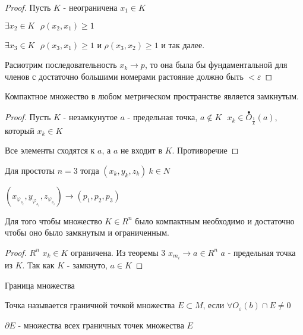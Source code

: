 \begin{proof}
  Пусть $K$ - неограничена $x_1 \in K$

  $\exists x_2 \in K ~~~ \rho(x_2, x_1) \ge 1$

  $\exists x_3 \in K ~~~ \rho(x_3, x_1) \ge 1$ и $\rho(x_3, x_2) \ge 1$ и так
  далее.

  Расиотрим последовательность $x_k \to p$, то она была бы фундаментальной для
  членов с достаточно большими номерами растояние должно быть $< \varepsilon$
\end{proof}

\begin{theorem}
  Компактное множество в любом метрическом пространстве является замкнутым.
\end{theorem}

\begin{proof}
  Пусть $K$ - незамкунутое $a$ - предельная точка, $a \not\in K ~~~
  x_k \in \stackrel{\bullet}{O}_{\frac{1}{k}}(a)$, который $x_k \in K$

  Все элементы сходятся к $a$, а $a$ не входит в $K$. Противоречие
\end{proof}

\begin{theorem}
  Для простоты $n = 3$ тогда $(x_k, y_k, z_k) ~ k \in N$

  $(x_{\varphi_{s_i}}, y_{\varphi_{s_i}}, z_{\varphi_{s_i}}) \to
  (p_1, p_2, p_3)$
\end{theorem}

\begin{theorem}
  Для того чтобы множество $K \in R^n$ было компактным необходимо и достаточно
  чтобы оно было замкнутым и ограниченным.
\end{theorem}

\begin{proof}
  $R^n$ $x_k \in K$ ограничена. Из теоремы 3 $x_{m_i} \to a \in R^n$ $a$ -
  предельная точка из $K$. Так как $K$ - замкнуто, $a \in K$
\end{proof}

\begin{title}[\Large]
  Граница множества
\end{title}

\begin{define}
  Точка называется граничной точкой множества $E \subset M$, если
  $\forall O_{\varepsilon}(b)\cap E \not= 0$

  $\partial E$ - множества всех граничных точек множества $E$
\end{define}

